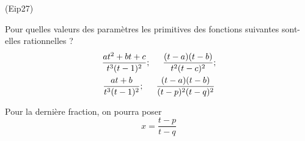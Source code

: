 \begin{tiny}(Eip27)\end{tiny} Pour quelles valeurs des paramètres les primitives des fonctions suivantes sont-elles rationnelles ?
\begin{multline*}
 \frac{at^2+bt+c}{t^3(t-1)^2}; \hspace{0.5cm}\frac{(t-a)(t-b)}{t^2(t-c)^2}; \\
\frac{at+b}{t^3(t-1)^2};\hspace{0.5cm}\frac{(t-a)(t-b)}{(t-p)^2(t-q)^2}
\end{multline*}

Pour la dernière fraction, on pourra poser
\begin{displaymath}
 x=\frac{t-p}{t-q}
\end{displaymath}
